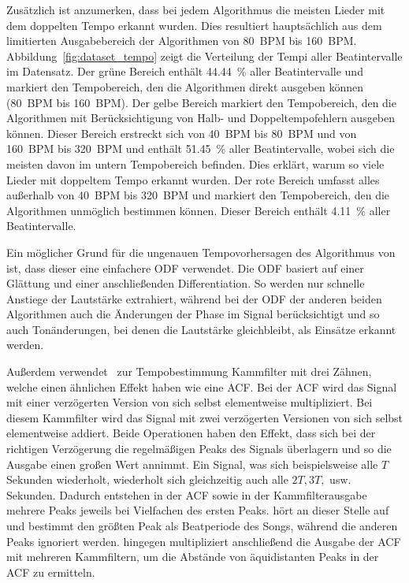 {{		Zusätzlich ist anzumerken,
			dass bei jedem Algorithmus die meisten Lieder mit dem doppelten Tempo erkannt wurden.
		Dies resultiert hauptsächlich aus dem limitierten Ausgabebereich der Algorithmen von \SI{80}{\ac{BPM}} bis \SI{160}{\ac{BPM}}.
		Abbildung~\ref{fig:dataset_tempo} zeigt die Verteilung der Tempi aller Beatintervalle im Datensatz.
		Der grüne Bereich enthält \SI{44.44}{\percent} aller Beatintervalle
			und markiert den Tempobereich,
			den die Algorithmen direkt ausgeben können (\SI{80}{\ac{BPM}} bis \SI{160}{\ac{BPM}}).
		Der gelbe Bereich markiert den Tempobereich,
			den die Algorithmen mit Berücksichtigung von Halb- und Doppeltempofehlern ausgeben können.
		Dieser Bereich erstreckt sich von \SI{40}{\ac{BPM}} bis \SI{80}{\ac{BPM}} und von \SI{160}{\ac{BPM}} bis \SI{320}{\ac{BPM}}
			und enthält \SI{51.45}{\percent} aller Beatintervalle,
			wobei sich die meisten davon im untern Tempobereich befinden.
		Dies erklärt,
			warum so viele Lieder mit doppeltem Tempo erkannt wurden.
		Der rote Bereich umfasst alles au{\ss}erhalb von \SI{40}{\ac{BPM}} bis \SI{320}{\ac{BPM}}
			und markiert den Tempobereich,
			den die Algorithmen unmöglich bestimmen können.
		Dieser Bereich enthält \SI{4.11}{\percent} aller Beatintervalle.

		Ein möglicher Grund für die ungenauen Tempovorhersagen des Algorithmus von~\cite{2001_BeatThis}
			ist,
			dass dieser eine einfachere \ac{ODF} verwendet.
		Die \ac{ODF} basiert auf einer Glättung und einer anschlie{\ss}enden Differentiation.
		So werden nur schnelle Anstiege der Lautstärke extrahiert,
			während bei der \ac{ODF} der anderen beiden Algorithmen auch die Änderungen der Phase im Signal berücksichtigt
			und so auch Tonänderungen,
			bei denen die Lautstärke gleichbleibt,
			als Einsätze erkannt werden.

		Au{\ss}erdem verwendet~\cite{2001_BeatThis} zur Tempobestimmung Kammfilter mit drei Zähnen,
			welche einen ähnlichen Effekt haben wie eine \ac{ACF}.
		Bei der \ac{ACF} wird das Signal mit einer verzögerten Version von sich selbst elementweise multipliziert.
		Bei diesem Kammfilter wird das Signal mit zwei verzögerten Versionen von sich selbst elementweise addiert.
		Beide Operationen haben den Effekt,
			dass sich bei der richtigen Verzögerung
			die regelmä{\ss}igen Peaks des Signals überlagern
			und so die Ausgabe einen gro{\ss}en Wert annimmt.
		Ein Signal,
			was sich beispielsweise alle $T$ Sekunden wiederholt,
			wiederholt sich gleichzeitig auch alle $2T, 3T,$ usw. Sekunden.
		Dadurch entstehen in der \ac{ACF} sowie in der Kammfilterausgabe mehrere Peaks jeweils bei Vielfachen des ersten Peaks.
		\cite{2001_BeatThis} hört an dieser Stelle auf
			und bestimmt den grö{\ss}ten Peak als Beatperiode des Songs,
			während die anderen Peaks ignoriert werden.
		\cite{2009_DaPlSt} hingegen multipliziert anschlie{\ss}end die Ausgabe der \ac{ACF} mit mehreren Kammfiltern,
			um die Abstände von äquidistanten Peaks in der \ac{ACF} zu ermitteln.

}}
